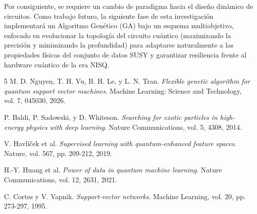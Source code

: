 \documentclass[11pt,a4paper]{article}
\begin{document}
Por consiguiente, se requiere un cambio de paradigma hacia el diseño dinámico de circuitos. Como trabajo futuro, la siguiente fase de esta investigación implementará un Algoritmo Genético (GA) bajo un esquema multiobjetivo, enfocado en evolucionar la topología del circuito cuántico (maximizando la precisión y minimizando la profundidad) para adaptarse naturalmente a las propiedades físicas del conjunto de datos SUSY y garantizar resiliencia frente al hardware cuántico de la era NISQ.

\renewcommand{\refname}{\normalsize Referencias}
\begin{thebibliography}{5}
    \footnotesize
    M. D. Nguyen, T. H. Vu, B. H. Le, y L. N. Tran. 
    \textit{Flexible genetic algorithm for quantum support vector machines}. 
    Machine Learning: Science and Technology, vol. 7, 045030, 2026.
    
    P. Baldi, P. Sadowski, y D. Whiteson.
    \textit{Searching for exotic particles in high-energy physics with deep learning}.
    Nature Communications, vol. 5, 4308, 2014.
    
    V. Havlíček et al.
    \textit{Supervised learning with quantum-enhanced feature spaces}.
    Nature, vol. 567, pp. 209-212, 2019.
    
    H.-Y. Huang et al.
    \textit{Power of data in quantum machine learning}.
    Nature Communications, vol. 12, 2631, 2021.
    
    C. Cortes y V. Vapnik.
    \textit{Support-vector networks}.
    Machine Learning, vol. 20, pp. 273-297, 1995.
\end{thebibliography}
\end{document}
